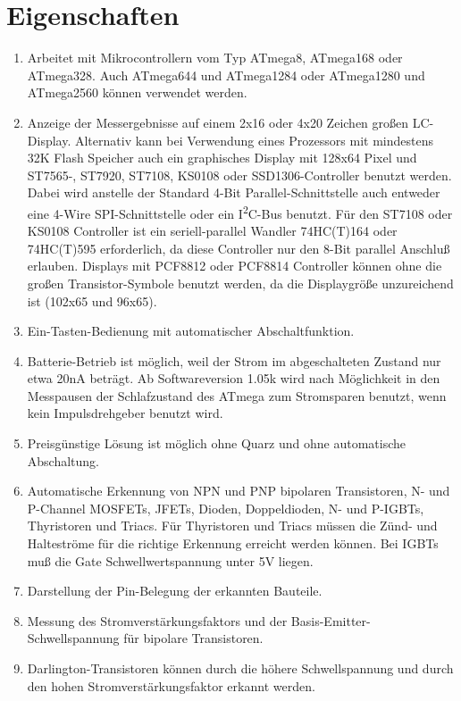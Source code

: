 \chapter{Eigenschaften}
\label{sec:features}
\begin{enumerate}
\item Arbeitet mit Mikrocontrollern vom Typ ATmega8, ATmega168 oder ATmega328. Auch ATmega644 und ATmega1284 oder ATmega1280 und ATmega2560 können verwendet werden.
\item Anzeige der Messergebnisse auf einem 2x16 oder 4x20 Zeichen großen LC-Display.
 Alternativ kann bei Verwendung eines Prozessors mit mindestens 32K Flash Speicher auch ein graphisches Display
 mit 128x64 Pixel und ST7565-, ST7920, ST7108, KS0108 oder SSD1306-Controller benutzt werden.
 Dabei wird anstelle der Standard 4-Bit Parallel-Schnittstelle
 auch entweder eine 4-Wire SPI-Schnittstelle oder ein I\textsuperscript{2}C-Bus benutzt.
 Für den ST7108 oder KS0108 Controller ist ein seriell-parallel Wandler 74HC(T)164 oder 74HC(T)595 erforderlich,
 da diese Controller nur den 8-Bit parallel Anschluß erlauben.
 Displays mit PCF8812 oder PCF8814 Controller können ohne die großen Transistor-Symbole benutzt werden, da
die Displaygröße unzureichend ist (102x65 und 96x65).
\item Ein-Tasten-Bedienung mit automatischer Abschaltfunktion.
\item Batterie-Betrieb ist möglich, weil der Strom im abgeschalteten Zustand nur etwa 20nA beträgt.
Ab Softwareversion 1.05k wird nach Möglichkeit in den Messpausen der Schlafzustand des ATmega zum Stromsparen benutzt, wenn kein Impulsdrehgeber benutzt wird.
\item Preisgünstige Lösung ist möglich ohne Quarz und ohne automatische Abschaltung.
\item Automatische Erkennung von NPN und PNP bipolaren Transistoren, N- und P-Channel MOSFETs, JFETs,
Dioden, Doppeldioden, N- und P-IGBTs, Thyristoren und Triacs.
Für Thyristoren und Triacs müssen die Zünd- und Halteströme für die richtige Erkennung erreicht werden können.
Bei IGBTs muß die Gate Schwellwertspannung unter 5V liegen.
\item Darstellung der Pin-Belegung der erkannten Bauteile.
\item Messung des Stromverstärkungsfaktors und der Basis-Emitter-Schwellspannung für bipolare Transistoren.
\item Darlington-Transistoren können durch die höhere Schwellspannung und durch den hohen Stromverstärkungsfaktor erkannt werden.

\end{enumerate}
